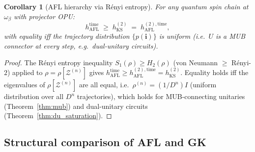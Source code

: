 \documentclass[12pt,a4paper]{article}
\newtheorem{corollary}[theorem]{Corollary}
\begin{document}
\begin{corollary}[AFL hierarchy via R\'enyi entropy]
  \label{cor:afl_hierarchy_renyi}
  For any quantum spin chain at $\omega_\beta$ with projector OPU:
  \[
    h_{\mathrm{AFL}}^{\mathrm{time}}
    \;\geq\; h_{\mathrm{KS}}^{(2)}
    \;=\; h_{\mathrm{AFL}}^{(2),\mathrm{time}},
  \]
  with equality iff the trajectory distribution $\{p(\mathbf{i})\}$ is uniform
  (i.e.\ $U$ is a MUB connector at every step, e.g.\ dual-unitary circuits).
\end{corollary}
\begin{proof}
  The R\'enyi entropy inequality $S_1(\rho) \geq H_2(\rho)$ (von Neumann $\geq$
  R\'enyi-$2$) applied to $\rho = \rho[\mathcal{Z}^{(n)}]$ gives
  $h_{\mathrm{AFL}}^{\mathrm{time}} \geq h_{\mathrm{AFL}}^{(2),\mathrm{time}} =
  h_{\mathrm{KS}}^{(2)}$.  Equality holds iff the eigenvalues of
  $\rho[\mathcal{Z}^{(n)}]$ are all equal, i.e.\ $\rho^{(n)} = (1/D^n)I$
  (uniform distribution over all $D^n$ trajectories), which holds for MUB-connecting
  unitaries (Theorem~\ref{thm:mub}) and dual-unitary circuits
  (Theorem~\ref{thm:du_saturation}).
\end{proof}

\subsection{Structural comparison of AFL and GK}
\end{document}
